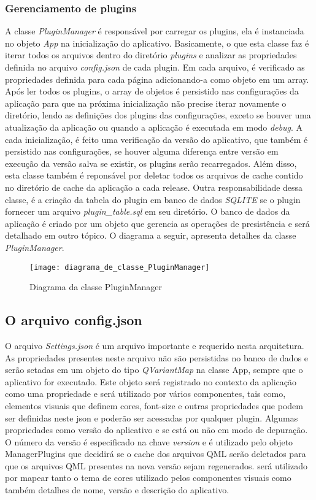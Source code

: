 \subsubsection{Gerenciamento de plugins}\label{sec:solucao-desenvolvida}
A classe \textit{PluginManager} é responsável por carregar os plugins, ela é instanciada no objeto \textit{App} na inicialização do aplicativo. Basicamente, o que esta classe faz é iterar todos os arquivos dentro do diretório \textit{plugins} e analizar as propriedades definida no arquivo \textit{config.json} de cada plugin. Em cada arquivo, é verificado as propriedades definida para cada página adicionando-a como objeto em um array. Após ler todos os plugins, o array de objetos é persistido nas configurações da aplicação para que na próxima inicialização não precise iterar novamente o diretório, lendo as definições dos plugins das configurações, exceto se houver uma atualização da aplicação ou quando a aplicação é executada em modo \textit{debug}. A cada inicialização, é feito uma verificação da versão do aplicativo, que também é persistido nas configurações, se houver alguma diferença entre versão em execução da versão salva se existir, os plugins serão recarregados. Além disso, esta classe também é reponsável por deletar todos os arquivos de cache contido no diretório de cache da aplicação a cada release. Outra responsabilidade dessa classe, é a criação da tabela do plugin em banco de dados \textit{SQLITE} se o plugin fornecer um arquivo \textit{plugin\_table.sql} em seu diretório. O banco de dados da aplicação é criado por um objeto que gerencia as operações de presistência e será detalhado em outro tópico. O diagrama a seguir, apresenta detalhes da classe \textit{PluginManager}.

\begin{figure}[h]
	\texttt{[image: diagrama\_de\_classe\_PluginManager]}
	\centering
	\caption{Diagrama da classe PluginManager}
\end{figure}

\subsection{O arquivo config.json}\label{sec:solucao-desenvolvida}
O arquivo \textit{Settings.json} é um arquivo importante e requerido nesta arquitetura. As propriedades presentes neste arquivo não são persistidas no banco de dados e serão setadas em um objeto do tipo \textit{QVariantMap} na classe App, sempre que o aplicativo for executado. Este objeto será registrado no contexto da aplicação como uma propriedade e será utilizado por vários componentes, tais como, elementos visuais que definem cores, font-size e outras propriedades que podem ser definidas neste json e poderão ser acessadas por qualquer plugin. Algumas propriedades como versão do aplicativo e se está ou não em modo de depuração. O número da versão é especificado na chave \textit{version} e é utilizado pelo objeto ManagerPlugins que decidirá se o cache dos arquivos QML serão deletados para que os arquivos QML presentes na nova versão sejam regenerados. será utilizado por mapear tanto o tema de cores utilizado pelos componentes visuais como também detalhes de nome, versão e descrição do aplicativo.


